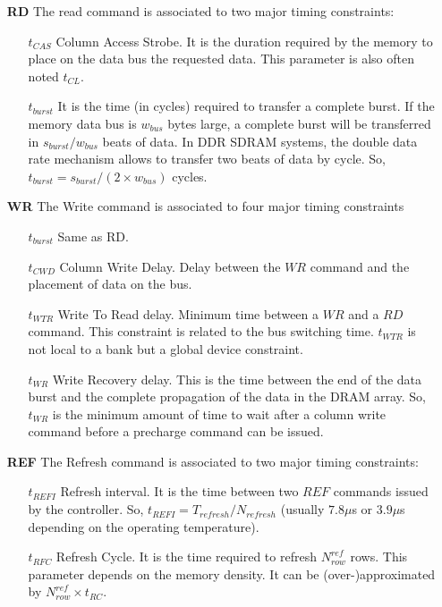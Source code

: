 \documentclass[main.tex]{subfiles}
\begin{document}
\begin{itemize}
    \item[\textbf{RD}] The read command is associated to two major timing
        constraints:
        \begin{itemize}
            \item[$t_{CAS}$] Column Access Strobe. It is the duration required
                by the memory to place on the data bus the requested data. This
                parameter is also often noted $t_{CL}$.
            \item[$t_{burst}$]  It is the time (in cycles) required to transfer
                a complete burst. If the memory data bus is $w_{bus}$ bytes
                large, a complete burst will be transferred in
                ${s_{burst}}/{w_{bus}}$ beats of data. In DDR SDRAM systems,
                the double data rate mechanism allows to transfer two beats of
                data by cycle. So, $t_{burst} = {s_{burst}}/(2 \times w_{bus})$
                cycles.
        \end{itemize}
    
    \item[\textbf{WR}] The Write command is associated to four major timing
        constraints
        \begin{itemize}
            \item[$t_{burst}$] Same as RD.
            \item[$t_{CWD}$] Column Write Delay. Delay between the $WR$ command
                and the placement of data on the bus.
            \item[$t_{WTR}$] Write To Read delay. Minimum time between a $WR$
                and a $RD$ command. This constraint is related to the bus
                switching time. $t_{WTR}$ is not local to a bank but a global
                device constraint.
            \item[$t_{WR}$] Write Recovery delay. This is the time between the
                end of the data burst and the complete propagation of the data
                in the DRAM array. So, $t_{WR}$ is the minimum amount of time
                to wait after a column write command before a precharge command
                can be issued.
        \end{itemize}
    
    \item[\textbf{REF}] The Refresh command is associated to two major timing
        constraints:
        \begin{itemize}
            \item[$t_{REFI}$] Refresh interval. It is the time between two
                $REF$ commands issued by the controller. So, $t_{REFI} =
                T_{refresh} / N_{refresh}$ (usually $7.8\mu$s  or $3.9\mu$s
                depending on the operating temperature). 
            \item[$t_{RFC}$] Refresh Cycle. It is the time required to refresh
                $N_{row}^{ref}$ rows. This parameter depends on the memory
                density. It can be (over-)approximated by $N_{row}^{ref} \times
                t_{RC}$.\\
        \end{itemize}
\end{itemize}
\end{document}
